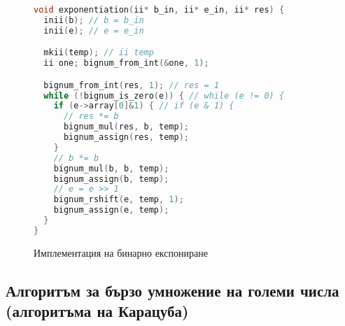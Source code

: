 \begin{figure}[p]
\caption{Имплементация на бинарно експониране}
\begin{lstlisting}[language=C]
void exponentiation(ii* b_in, ii* e_in, ii* res) {
  inii(b); // b = b_in
  inii(e); // e = e_in

  mkii(temp); // ii temp
  ii one; bignum_from_int(&one, 1);

  bignum_from_int(res, 1); // res = 1
  while (!bignum_is_zero(e)) { // while (e != 0) {
    if (e->array[0]&1) { // if (e & 1) {
      // res *= b
      bignum_mul(res, b, temp);
      bignum_assign(res, temp);
    }
    // b *= b
    bignum_mul(b, b, temp);
    bignum_assign(b, temp);
    // e = e >> 1
    bignum_rshift(e, temp, 1);
    bignum_assign(e, temp);
  }
}
\end{lstlisting}
\end{figure}

  \subsection{Алгоритъм за бързо умножение на големи числа (алгоритъма на Карацуба)} \label{karatsuba}

